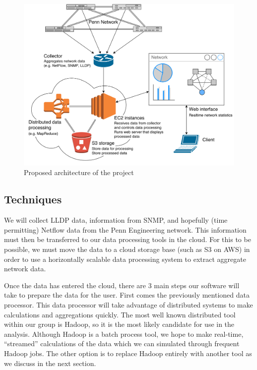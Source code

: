 \documentclass{sig-alternate}
\begin{document}
\begin{figure}[htb!]
    \centering
    \includegraphics[width=\linewidth]{mockup}
    \caption{Proposed architecture of the project}
    \label{fig:mockup}
\end{figure}

\subsection{Techniques}

We will collect LLDP data, information from SNMP, and hopefully (time
permitting) Netflow data from the Penn Engineering network. This information
must then be transferred to our data processing tools in the cloud. For this to
be possible, we must move the data to a cloud storage base (such as S3 on AWS)
in order to use a horizontally scalable data processing system to extract
aggregate network data.

Once the data has entered the cloud, there are 3 main steps our software will
take to prepare the data for the user. First comes the previously mentioned data
processor. This data processor will take advantage of distributed systems to
make calculations and aggregations quickly. The most well known distributed tool
within our group is Hadoop, so it is the most likely candidate for use in the
analysis. Although Hadoop is a batch process tool, we hope to make real-time,
“streamed” calculations of the data which we can simulated through frequent
Hadoop jobs. The other option is to replace Hadoop entirely with another tool as
we discuss in the next section.
\end{document}
